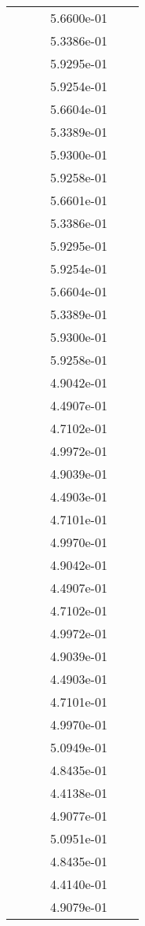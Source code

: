\begin{xltabular}{\textwidth}{r|rS[table-format=1.3e+2]S[table-format=1.4e+2]S[table-format=1.4e+2]S[table-format=-1.5]}
&  &  & 5.6600e-01 & & \\
&  &  & 5.3386e-01 & & \\
&  &  & 5.9295e-01 & & \\
&  &  & 5.9254e-01 & & \\
&  &  & 5.6604e-01 & & \\
&  &  & 5.3389e-01 & & \\
&  &  & 5.9300e-01 & & \\
&  &  & 5.9258e-01 & & \\
&  &  & 5.6601e-01 & & \\
&  &  & 5.3386e-01 & & \\
&  &  & 5.9295e-01 & & \\
&  &  & 5.9254e-01 & & \\
&  &  & 5.6604e-01 & & \\
&  &  & 5.3389e-01 & & \\
&  &  & 5.9300e-01 & & \\
&  &  & 5.9258e-01 & & \\
&  &  & 4.9042e-01 & & \\
&  &  & 4.4907e-01 & & \\
&  &  & 4.7102e-01 & & \\
&  &  & 4.9972e-01 & & \\
&  &  & 4.9039e-01 & & \\
&  &  & 4.4903e-01 & & \\
&  &  & 4.7101e-01 & & \\
&  &  & 4.9970e-01 & & \\
&  &  & 4.9042e-01 & & \\
&  &  & 4.4907e-01 & & \\
&  &  & 4.7102e-01 & & \\
&  &  & 4.9972e-01 & & \\
&  &  & 4.9039e-01 & & \\
&  &  & 4.4903e-01 & & \\
&  &  & 4.7101e-01 & & \\
&  &  & 4.9970e-01 & & \\
&  &  & 5.0949e-01 & & \\
&  &  & 4.8435e-01 & & \\
&  &  & 4.4138e-01 & & \\
&  &  & 4.9077e-01 & & \\
&  &  & 5.0951e-01 & & \\
&  &  & 4.8435e-01 & & \\
&  &  & 4.4140e-01 & & \\
&  &  & 4.9079e-01 & & \\

\end{xltabular}
